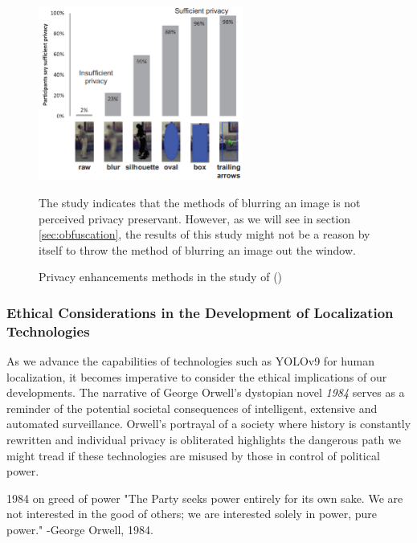 \begin{figure}[H]
    \centering
    \includegraphics[width=0.6\textwidth]{Images/ed2012results.png}
    \caption{Privacy enhancements methods in the study of  \citeauthor{ed2012privacy_review} (\citeyear{ed2012privacy_review})}
    \RaggedRight The study indicates that the methods of blurring an image is not perceived privacy preservant. However, as we will see in section \ref{sec:obfuscation}, the results of this study might not be a reason by itself to throw the method of blurring an image out the window.
    \label{fig:ed_results}
\end{figure}

\subsubsection{Ethical Considerations in the Development of Localization Technologies}
\label{sec:ethics_localization_tech}

As we advance the capabilities of technologies such as YOLOv9 for human localization, it becomes imperative to consider the ethical implications of our developments. The narrative of George Orwell's dystopian novel \textit{1984} serves as a reminder of the potential societal consequences of intelligent, extensive and automated surveillance. Orwell's portrayal of a society where history is constantly rewritten and individual privacy is obliterated highlights the dangerous path we might tread if these technologies are misused by those in control of political power.

\begin{myquote} {1984 on greed of power}
    "The Party seeks power entirely for its own sake. We are not interested in the good of others; we are interested solely in power, pure power." -George Orwell, 1984.
\end{myquote}

